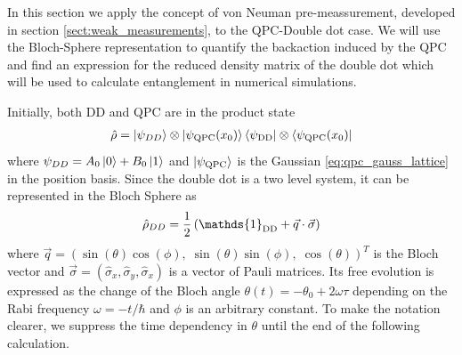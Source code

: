 \documentclass{article}
\newcommand{\Id}{\mathds{1}}
\begin{document}
In this section we apply the concept of 
von Neuman pre-meassurement, developed in section \ref{sect:weak_measurements}, to the QPC-Double dot case. We will use the Bloch-Sphere representation to quantify the 
backaction induced by the QPC and find an 
expression for the reduced density matrix 
of the double dot which will be used to 
calculate entanglement in numerical simulations.

Initially, both DD and QPC are in the product state 
\begin{align*}
    \hat{\rho} = \ket{\psi_{DD} }\otimes \ket{\psi_{\rm QPC}(x_0)}\bra{\psi_{\rm DD} }\otimes \bra{\psi_{\rm QPC}(x_0)}
\end{align*}
where $\psi_{DD} = A_0 \ket{0} + B_0 \ket{1}$ and $\ket{\psi_{\rm QPC}}$ is the Gaussian 
\eqref{eq:qpc_gauss_lattice} in the position basis. Since the double dot is a two level system, it can be 
represented in the Bloch Sphere as 
\begin{align}
    \hat{\rho}_{DD} = \frac{1}{2}\left( \Id_{\rm DD} + \vec{q}\cdot\vec{\sigma} \right)
\end{align} 
where $\vec{q} = (\sin(\theta)\cos(\phi), \; \sin(\theta)\sin(\phi), \; \cos(\theta))^T$ is the
Bloch vector and $\vec{\sigma} = (\hat{\sigma}_x, \hat{\sigma}_y, \hat{\sigma}_x )$ is 
a vector of Pauli matrices. Its free evolution is expressed as the change of the Bloch
angle $\theta(t) = -\theta_0+2\omega\tau$ depending on the Rabi frequency $\omega=-t/\hbar$ and 
$\phi$ is an arbitrary constant. To make the notation clearer, we suppress the time dependency in $\theta$ until
the end of the following calculation.
\end{document}
